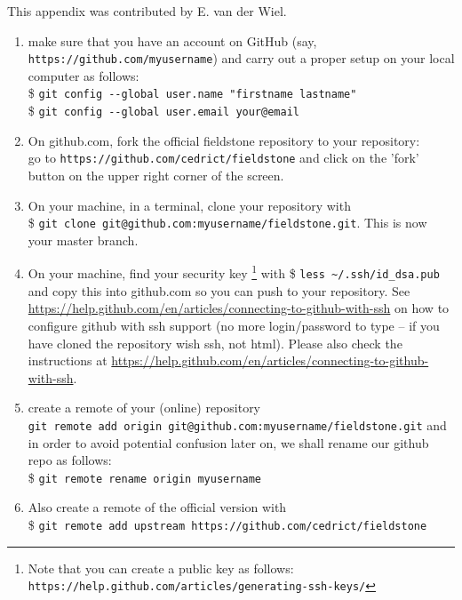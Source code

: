 \begin{mdframed}[backgroundcolor=red!5]
This appendix was contributed by E. van der Wiel.
\end{mdframed}


\begin{enumerate}
\item make sure that you  have an account on GitHub (say, \verb"https://github.com/myusername") 
and carry out a proper setup on your local computer as follows:\\
\$ \verb'git config --global user.name "firstname lastname" '\\
\$ \verb'git config --global user.email your@email'

\item On github.com, fork the official fieldstone 
repository to your repository:\\
go to \verb"https://github.com/cedrict/fieldstone" 
and click on the 'fork' button on the upper right corner of the screen.
\item On your machine, in a terminal, clone your repository with \\
\$ \verb"git clone git@github.com:myusername/fieldstone.git". This is now your master branch.

\item On your machine, find your security key \footnote{
Note that you can create a public key as follows: 
{\tt https://help.github.com/articles/generating-ssh-keys/}}
 with \$ \verb"less ~/.ssh/id_dsa.pub" and copy this into github.com 
so you can push to your repository. See \url{https://help.github.com/en/articles/connecting-to-github-with-ssh} on how to configure github with ssh support (no more login/password to type -- if you have cloned the repository wish ssh, not html).
Please also check the instructions at \url{https://help.github.com/en/articles/connecting-to-github-with-ssh}.  
 
\item create a remote of your (online) repository\\
\verb"git remote add origin git@github.com:myusername/fieldstone.git"
and in order to avoid potential confusion later on, we shall rename our github repo as follows:\\
\$ \verb"git remote rename origin myusername" 

\item Also create a remote of the official version with\\
\$ \verb"git remote add upstream https://github.com/cedrict/fieldstone"

\end{enumerate}


